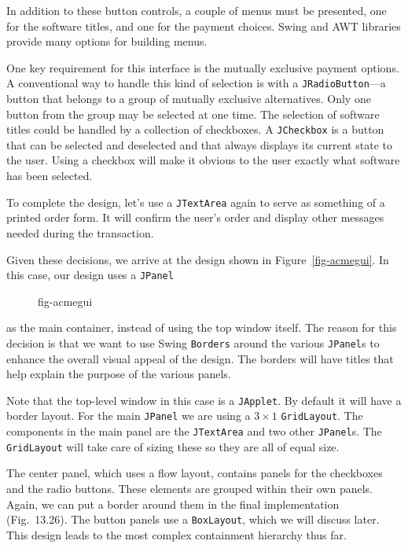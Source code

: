In addition to these button controls, a couple of menus must be
presented, one for the software titles, and one for the payment
choices.  Swing and AWT libraries provide many options for building
menus.

One key requirement for this interface is the mutually exclusive
payment options.  A conventional way to handle this kind of selection
is with a {\tt JRadioButton}---a button that belongs to a group of
mutually exclusive alternatives.  Only one button from the group may be
selected at one time.   The selection of software titles could be
handled by a collection of checkboxes.  A {\tt JCheckbox} is a button
that can be selected and deselected and that always displays its
current state to the user.  Using a checkbox will make it obvious to
the user exactly what software has been selected.

To complete the design, let's use a {\tt JTextArea} again to serve
as something of a printed order form.  It will confirm the user's
order and display other messages needed during the transaction.


Given these decisions, we arrive at the design shown in
Figure~\ref{fig-acmegui}. In this case, our design uses a {\tt JPanel}
\begin{figure}[b]
{fig-acmegui}
\end{figure}
as the main container, instead of using the top window itself.  The
reason for this decision is that we want to use Swing {\tt Borders}
around the various {\tt JPanel}s to enhance the overall visual appeal
of the design.  The borders will have titles that help explain the
purpose of the various panels.

Note that the top-level window in this case is a {\tt JApplet}. By default
it will have a border layout.  For the main {\tt JPanel} we are using a
$3 \times 1$ {\tt GridLayout}. The components in the main panel are
the {\tt JTextArea} and two other {\tt JPanel}s.  The {\tt GridLayout}
will take care of sizing these so they are all of equal size.


The center panel, which uses a flow layout, contains panels for the
checkboxes and
the radio buttons.  These elements are grouped within
their own panels.  Again, we can put a border around them in the final
implementation (Fig.~13.26).  The button panels use a
{\tt BoxLayout}, which we will discuss later.
This design leads to the most complex containment hierarchy thus far.

